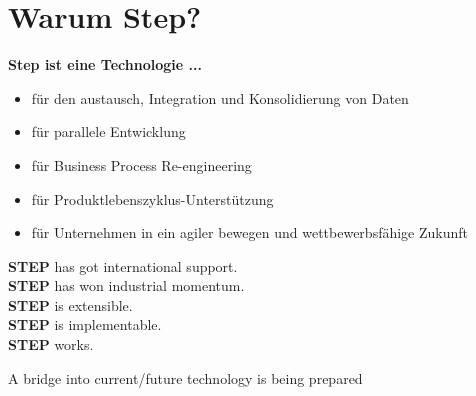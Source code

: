 \newpage\section{Warum Step?}

\textbf{Step ist eine Technologie ...}

\begin{itemize}
\item für den austausch, Integration und Konsolidierung von Daten
\item für parallele Entwicklung
\item für Business Process Re-engineering 
\item für Produktlebenszyklus-Unterstützung 
\item für Unternehmen in ein agiler bewegen und wettbewerbsfähige Zukunft
\end{itemize}

\textbf{STEP} has got international support. \\
\textbf{STEP} has won industrial momentum.  \\
\textbf{STEP} is extensible.  \\
\textbf{STEP} is implementable.  \\
\textbf{STEP} works.
 
A bridge into current/future technology is being prepared 


